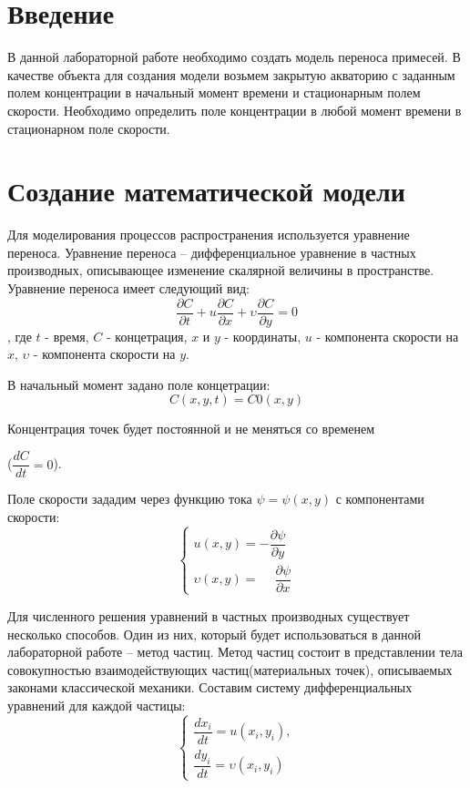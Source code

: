 \documentclass[a4paper, 14pt]{extarticle}
\begin{document}
	\pagebreak	

	\section{Введение}
		В данной лабораторной работе необходимо создать модель переноса примесей. В качестве объекта для создания модели возьмем закрытую акваторию с заданным полем концентрации в начальный момент времени и стационарным полем скорости. Необходимо определить поле концентрации в любой момент времени в стационарном поле скорости.
	\section{Создание математической модели}
	 	Для моделирования процессов распространения используется уравнение переноса. Уравнение переноса -- дифференциальное уравнение в частных производных, описывающее изменение скалярной величины в пространстве.
		Уравнение переноса имеет следующий вид:
		\[\dfrac{\partial C}{\partial t} + u \dfrac{\partial C}{\partial x} + \upsilon \dfrac{\partial C}{\partial y} = 0 \], где $t$ - время, $C$ - концетрация, $x$ и $y$ - координаты, $u$ - компонента скорости на $x$, $\upsilon$ - компонента скорости на $y$.
		
		В начальный момент задано поле концетрации:
		\[ C(x, y, t) = C0(x, y)\]
		
		Концентрация точек будет постоянной и не меняться со временем
		
		\bigg($\dfrac{dC}{dt} = 0$\bigg).
		
		Поле скорости зададим через функцию тока $\psi = \psi(x, y)$ с компонентами скорости:
		\[ \begin{cases}
			u (x, y) = -\dfrac{\partial \psi}{\partial y} \\[7pt]
			\upsilon (x, y) = \phantom{-} \dfrac{\partial \psi}{\partial x}
		\end{cases} \]
		
		Для численного решения уравнений в частных производных существует несколько способов. Один из них, который будет использоваться в данной лабораторной работе -- метод частиц. Метод частиц состоит в представлении тела совокупностью взаимодействующих частиц(материальных точек), описываемых законами классической механики.
		Составим систему дифференциальных уравнений для каждой частицы:
		\[ \begin{cases}
				\dfrac{dx_i}{dt} = u(x_i, y_i), \\[7pt]
				\dfrac{dy_i}{dt} = \upsilon(x_i, y_i)
			\end{cases}
		\]
\end{document}
